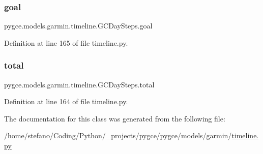 \subsubsection{\texorpdfstring{goal}{goal}}
{\footnotesize\ttfamily pygce.\+models.\+garmin.\+timeline.\+G\+C\+Day\+Steps.\+goal}



Definition at line 165 of file timeline.\+py.

\mbox{\label{classpygce_1_1models_1_1garmin_1_1timeline_1_1_g_c_day_steps_accaf8fa0f07a44164f5e2ee3a4c5fca7}} 
\subsubsection{\texorpdfstring{total}{total}}
{\footnotesize\ttfamily pygce.\+models.\+garmin.\+timeline.\+G\+C\+Day\+Steps.\+total}



Definition at line 164 of file timeline.\+py.



The documentation for this class was generated from the following file\+:\begin{DoxyCompactItemize}
\item 
/home/stefano/\+Coding/\+Python/\+\_\+projects/pygce/pygce/models/garmin/\hyperlink{timeline_8py}{timeline.\+py}\end{DoxyCompactItemize}
